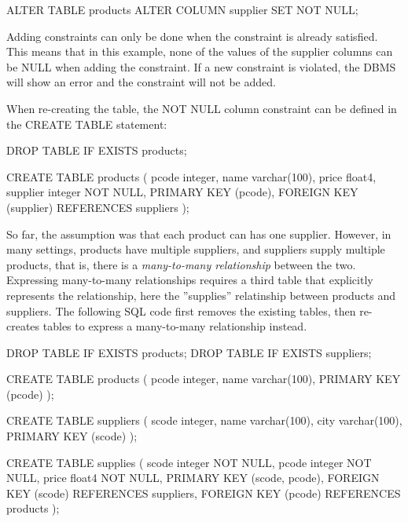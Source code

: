 \begin{sqlcode}
ALTER TABLE products ALTER COLUMN supplier SET NOT NULL;
\end{sqlcode}

Adding constraints can only be done when the constraint is already satisfied. This means that in this example, none of the values of the supplier columns can be NULL when adding the constraint. If a new constraint is violated, the DBMS will show an error and the constraint will not be added.

When re-creating the table, the NOT NULL column constraint can be defined in the CREATE TABLE statement:

\begin{samepage}
\begin{sqlcode}
DROP TABLE IF EXISTS products;

CREATE TABLE products (
  pcode    integer,
  name     varchar(100),
  price    float4,
  supplier integer NOT NULL,
  PRIMARY KEY (pcode),
  FOREIGN KEY (supplier) REFERENCES suppliers 
);
\end{sqlcode}
\end{samepage}

So far, the assumption was that each product can has one supplier. However, in many settings, products have multiple suppliers, and suppliers supply multiple products, that is, there is a \emph{many-to-many relationship} between the two. Expressing many-to-many relationships requires a third table that explicitly represents the relationship, here the ''supplies'' relatinship between products and suppliers. The following SQL code first removes the existing tables, then re-creates tables to express a many-to-many relationship instead.

\begin{samepage}
\begin{sqlcode}
DROP TABLE IF EXISTS products;
DROP TABLE IF EXISTS suppliers;

CREATE TABLE products (
  pcode integer,
  name  varchar(100),
  PRIMARY KEY (pcode) );

CREATE TABLE suppliers (
  scode integer,
  name  varchar(100),
  city  varchar(100),
  PRIMARY KEY (scode) );
  
CREATE TABLE supplies (
  scode  integer NOT NULL,
  pcode  integer NOT NULL,
  price  float4 NOT NULL,
  PRIMARY KEY (scode, pcode),
  FOREIGN KEY (scode) REFERENCES suppliers,
  FOREIGN KEY (pcode) REFERENCES products );
\end{sqlcode}
\end{samepage}

